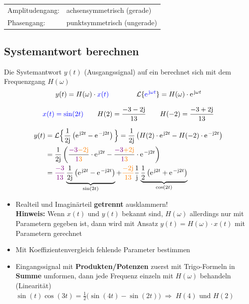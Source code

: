 \smallbreak

\begin{tabular}{ll}
    Amplitudengang: & achsensymmetrisch (gerade)    \\
    Phasengang:     & punktsymmetrisch (ungerade)
\end{tabular}

\subsection{Systemantwort berechnen}

Die Systemantwort $y(t)$ (Ausgangssignal) auf ein  berechnet sich mit dem Frequenzgang $H(\omega)$ 
$$ y(t) = H(\omega) \cdot \cbl{x(t)} \qquad \qquad \mathcal{L} \{ \cbl{ \e^{\jimg \omega  t} } \} = H(\omega) \cdot \e^{\jimg \omega t} $$ 



\vspace{-0.2cm}
$${\color{blue}x(t) = \sin(2t)} \qquad H(2) = \frac{-3-2\mathrm{j}}{13} \qquad H(-2) = \frac{-3+2\mathrm{j}}{13}$$
\vspace{-0.4cm}

\begin{align*}
    y(t)    &= \mathcal{L} \Big\{ \frac{1}{2 \jimg}  \left( \e^{\jimg 2t} - \e^{- \jimg 2t} \right) \Big\} = \frac{1}{2 \jimg} \left(H(2) \cdot \e^{\jimg 2t} - H(-2) \cdot \e^{-\jimg 2t} \right) \\
            &= \frac{1}{2\jimg} \left( \frac{\cvt{-3}\cor{-2\jimg}}{\cvt{1}\cor{3}} \cdot \e^{\jimg2t} 
            - \frac{\cvt{-3}\cor{+2\jimg}}{\cvt{1}\cor{3}} \cdot \e^{-\jimg2t} \right) \\
            &= \cvt{\frac{-3}{13}} \underbrace{ \frac{1}{2\jimg} \left( \e^{\jimg2t} - \e^{-\jimg2t} \right)}_{\substack{\sin(2t)}} 
            + \cor{\frac{-2 \jimg}{13}}  \frac{1}{\jimg} \underbrace{\frac{1}{2} \left( \e^{\jimg2t} + \e^{-\jimg2t} \right)}_{\substack{\cos(2t)}}
\end{align*}

\begin{itemize}
    \item Realteil und Imaginärteil \textbf{getrennt} ausklammern! \\
        \textbf{Hinweis:} Wenn $x(t)$ und $y(t)$ bekannt sind, $H(\omega)$ allerdings nur mit Parametern gegeben ist, dann wird mit Ansatz
        $y(t) = H(\omega) \cdot x(t)$ mit Parametern gerechnet
    \item Mit Koeffizientenvergleich fehlende Parameter bestimmen
    \item Eingangssignal mit \textbf{\color{red}Produkten/Potenzen}
    zuerst mit Trigo-Formeln in \textbf{Summe} umformen,
    dann jede Frequenz einzeln mit $H(\omega)$ behandeln (Linearität) \\
    $\sin(t)\cos(3t) = \frac{1}{2}\big(\sin(4t) - \sin(2t)\big)
    \;\Rightarrow\; H(4)$ und $H(2)$
\end{itemize}


